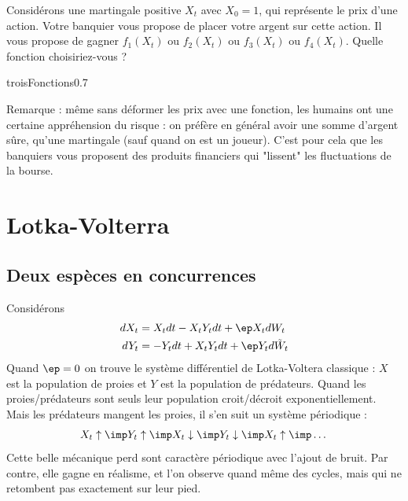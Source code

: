 \documentclass{article}
\begin{document}
\begin{exo} Considérons  une martingale positive $X_t$ avec $X_0=1$, qui représente le prix d'une action.  Votre banquier vous propose de placer votre argent sur cette action. Il vous propose de gagner  $f_1(X_t)$ ou  $f_2(X_t)$ ou  $f_3(X_t)$ ou $f_4(X_t)$. Quelle fonction choisiriez-vous ?
\begin{fenetre}{troisFonctions}{0.7}
\end{fenetre}

\end{exo}





Remarque : même sans déformer les prix avec une fonction, les humains ont une certaine appréhension du risque :  on préfère en général avoir une somme d'argent sûre, qu'une martingale (sauf quand on est un joueur). C'est pour cela que les banquiers vous proposent des produits financiers qui "lissent" les fluctuations de la bourse.










\section{Lotka-Volterra}


\subsection{Deux espèces en concurrences}

\begin{exemple} Considérons 
\begin{alignat*}{1}
dX_t &= X_t dt  - X_t Y_tdt  + \ep X_t dW_t\\
dY_t &= -Y_t dt  + X_t Y_tdt  + \ep Y_t d\tilde W_t
\end{alignat*}
Quand $\ep=0$ on trouve le système différentiel de Lotka-Voltera classique :  $X$ est la population de proies et $Y$ est la population de prédateurs. Quand les proies/prédateurs sont seuls leur population croit/décroit exponentiellement. Mais les prédateurs mangent les proies, il s'en suit un système périodique  : 
$$
X_t\uparrow  \imp  Y_t\uparrow \imp X_t \downarrow  \imp Y_t \downarrow \imp X_t\uparrow  \imp  \dots
$$
Cette belle mécanique perd sont caractère périodique avec l'ajout de bruit. Par contre, elle gagne en réalisme, et l'on  observe quand même  des cycles, mais qui ne retombent pas exactement sur leur pied. 
\end{exemple}
\end{document}
